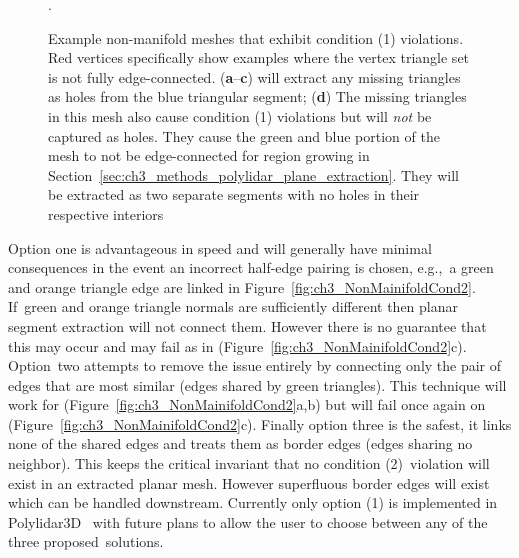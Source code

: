 \begin{figure}[ht]
\begin{subfigure}{.24\linewidth}
    \caption{\label{fig:ch3_NonMainifoldCond1D}}\vspace{6pt}
  \end{subfigure}
  \caption[Example non-manifold meshes with condition one violations]{Example non-manifold meshes that exhibit condition (1) violations. Red vertices specifically show examples where the vertex triangle set is not fully edge-connected. (\textbf{a}--\textbf{c}) will extract any missing triangles as holes from the blue triangular segment;  (\textbf{d}) The missing triangles in this mesh also cause condition (1) violations but will \emph{not} be captured as holes. They cause the green and blue portion of the mesh to not be edge-connected for region growing in Section~\ref{sec:ch3_methods_polylidar_plane_extraction}. They will be extracted as two separate segments with no holes in their respective interiors}. \label{fig:ch3_NonMainifoldCond1}
\end{figure}

\vspace{-6pt}

Option one is advantageous in speed and will generally have minimal consequences in the event an incorrect half-edge pairing is chosen, e.g.,~a green and orange triangle edge are linked in Figure~\ref{fig:ch3_NonMainifoldCond2}. If~green and orange triangle normals are sufficiently different then planar segment extraction will not connect them. However there is no guarantee that this may occur and may fail as in (Figure~\ref{fig:ch3_NonMainifoldCond2}c). Option~two attempts to remove the issue entirely by connecting only the pair of edges that are most similar (edges shared by green triangles). This technique will work for (Figure~\ref{fig:ch3_NonMainifoldCond2}a,b) but will fail once again on (Figure~\ref{fig:ch3_NonMainifoldCond2}c). Finally option three is the safest, it links none of the shared edges and treats them as border edges (edges sharing no neighbor).  This keeps the critical invariant that no condition (2)~violation will exist in an extracted planar mesh. However superfluous border edges will exist which can be handled downstream. Currently only option (1) is implemented in Polylidar3D~\cite{Castagno_Github_Polylidar} with future plans to allow the user to choose between any of the three proposed~solutions. 


